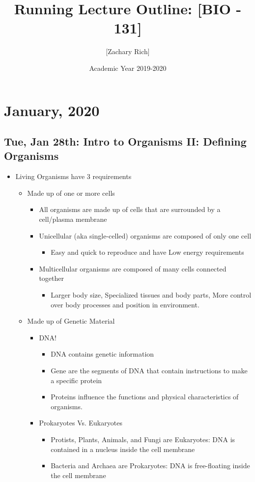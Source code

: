 \documentclass[10pt, oneside]{article}
\title{Running Lecture Outline: [BIO - 131]}
\author{[Zachary Rich]}
\date{Academic Year 2019-2020}
\begin{document}
\maketitle
\tableofcontents

\vspace{.25in}

\section{January, 2020}

\subsection{Tue, Jan 28th: Intro to Organisms II: Defining Organisms}

\begin{itemize}

\item Living Organisms have 3 requirements
\begin{itemize}
	\item Made up of one or more cells
	\begin{itemize}
		\item All organisms are made up of cells that are surrounded by a cell/plasma membrane
		\item Unicellular (aka single-celled) organisms are composed of only one cell
			\begin{itemize}
				\item Easy and quick to reproduce and have Low energy requirements
			\end{itemize}
		\item Multicellular organisms are composed of many cells connected together
			\begin{itemize}
				\item Larger body size, Specialized tissues and body parts, More control over body processes and position in environment.
			\end{itemize}
	\end{itemize}
	\item Made up of Genetic Material
		\begin{itemize}
			\item DNA!
			\begin{itemize}
				\item DNA contains genetic information
				\item Gene are the segments of DNA that contain instructions to make a specific protein
				\item Proteins influence the functions and physical characteristics of organisms.
			\end{itemize}
			\item Prokaryotes Vs. Eukaryotes
			\begin{itemize}
				\item Protists, Plants, Animals, and Fungi are Eukaryotes: DNA is contained in a nucleus inside the cell membrane
				\item Bacteria and Archaea are Prokaryotes: DNA is free-floating inside the cell membrane
			\end{itemize}
		\end{itemize}
			

\end{itemize}
\end{itemize}
\end{document}
